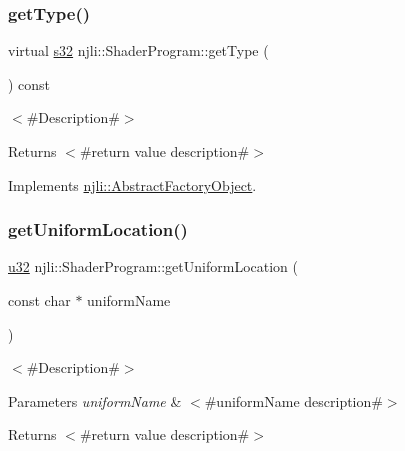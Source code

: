 \subsubsection{\texorpdfstring{get\+Type()}{getType()}}
{\footnotesize\ttfamily virtual \mbox{\hyperlink{_util_8h_aa62c75d314a0d1f37f79c4b73b2292e2}{s32}} njli\+::\+Shader\+Program\+::get\+Type (\begin{DoxyParamCaption}{ }\end{DoxyParamCaption}) const\hspace{0.3cm}{\ttfamily [virtual]}}

$<$\#\+Description\#$>$

\begin{DoxyReturn}{Returns}
$<$\#return value description\#$>$ 
\end{DoxyReturn}


Implements \mbox{\hyperlink{classnjli_1_1_abstract_factory_object_a207c86146d40d0794708ae7f2d4e60a7}{njli\+::\+Abstract\+Factory\+Object}}.

\mbox{\label{classnjli_1_1_shader_program_aa870b331b82002024be451a7d556d99c}} 
\subsubsection{\texorpdfstring{get\+Uniform\+Location()}{getUniformLocation()}}
{\footnotesize\ttfamily \mbox{\hyperlink{_util_8h_a10e94b422ef0c20dcdec20d31a1f5049}{u32}} njli\+::\+Shader\+Program\+::get\+Uniform\+Location (\begin{DoxyParamCaption}\item[{const char $\ast$}]{uniform\+Name }\end{DoxyParamCaption})}

$<$\#\+Description\#$>$


\begin{DoxyParams}{Parameters}
{\em uniform\+Name} & $<$\#uniform\+Name description\#$>$\\
\hline
\end{DoxyParams}
\begin{DoxyReturn}{Returns}
$<$\#return value description\#$>$ 
\end{DoxyReturn}
\mbox{\label{classnjli_1_1_shader_program_a01aeae9437f32732e8d2d3b59c962139}} 
